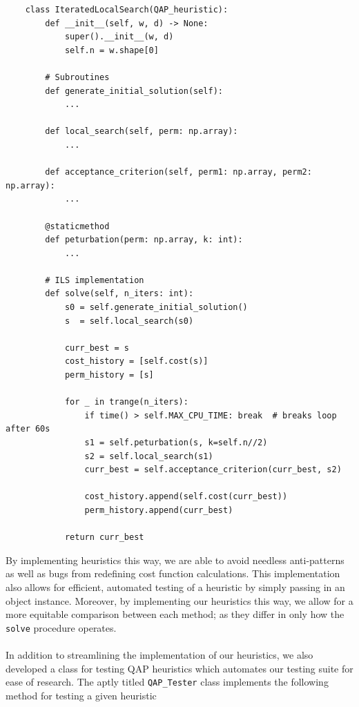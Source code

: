 \documentclass[a4paper,10pt]{article}
\begin{document}
\begin{verbatim}
    class IteratedLocalSearch(QAP_heuristic):
        def __init__(self, w, d) -> None:
            super().__init__(w, d)
            self.n = w.shape[0]
        
        # Subroutines
        def generate_initial_solution(self):
            ...
        
        def local_search(self, perm: np.array):
            ...
        
        def acceptance_criterion(self, perm1: np.array, perm2: np.array):
            ...
        
        @staticmethod
        def peturbation(perm: np.array, k: int):
            ...
        
        # ILS implementation
        def solve(self, n_iters: int):
            s0 = self.generate_initial_solution()
            s  = self.local_search(s0)
            
            curr_best = s
            cost_history = [self.cost(s)]
            perm_history = [s]
    
            for _ in trange(n_iters):
                if time() > self.MAX_CPU_TIME: break  # breaks loop after 60s  
                s1 = self.peturbation(s, k=self.n//2)
                s2 = self.local_search(s1)
                curr_best = self.acceptance_criterion(curr_best, s2)
                
                cost_history.append(self.cost(curr_best))
                perm_history.append(curr_best)
    
            return curr_best
\end{verbatim}
By implementing heuristics this way, we are able to avoid needless anti-patterns as well as  bugs from redefining cost function calculations. This implementation also allows for efficient, automated testing of a heuristic by simply passing in an object instance. Moreover, by implementing our heuristics this way, we allow for a more equitable comparison between each method; as they differ in only how the \texttt{solve} procedure operates. \\
\\
In addition to streamlining the implementation of our heuristics, we also 
developed a class for testing QAP heuristics which automates our testing suite for ease of research. The aptly titled \texttt{QAP\_Tester} class implements the following method for testing a given heuristic
\end{document}
